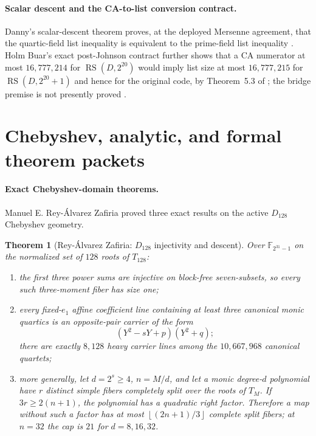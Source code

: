 \documentclass[11pt,a4paper]{amsart}
\numberwithin{equation}{section}
\newtheorem{theorem}{Theorem}[section]
\theoremstyle{remark}
\DeclareMathOperator{\RS}{RS}
\newcommand{\floor}[1]{\left\lfloor#1\right\rfloor}
\begin{document}
\paragraph{Scalar descent and the CA-to-list conversion contract.}
Danny's scalar-descent theorem proves, at the deployed Mersenne agreement, that the quartic-field list inequality is equivalent to the prime-field list inequality \cite{DannyM31Descent26}.  Holm Buar's exact post-Johnson contract further shows that a CA numerator at most $16{,}777{,}214$ for $\RS(D,2^{20})$ would imply list size at most $16{,}777{,}215$ for $\RS(D,2^{20}+1)$ and hence for the original code, by Theorem~5.3 of \cite{ABF26}; the bridge premise is not presently proved \cite{BuarM31PostJohnson26}.

\section{Chebyshev, analytic, and formal theorem packets}
\label{sec:other-experimental}

\paragraph{Exact Chebyshev-domain theorems.}
Manuel E. Rey-\'Alvarez Zafiria proved three exact results on the active $D_{128}$ Chebyshev geometry.

\begin{theorem}[Rey-\'Alvarez Zafiria: $D_{128}$ injectivity and descent]\label{thm:d128-package}
Over $\mathbb F_{2^{31}-1}$ on the normalized set of $128$ roots of $T_{128}$:
\begin{enumerate}[label=\textup{(\roman*)},leftmargin=*]
\item the first three power sums are injective on block-free seven-subsets, so every such three-moment fiber has size one;
\item every fixed-$e_1$ affine coefficient line containing at least three canonical monic quartics is an opposite-pair carrier of the form
\[
 (Y^2-sY+p)(Y^2+q);
\]
there are exactly $8{,}128$ heavy carrier lines among the $10{,}667{,}968$ canonical quartets;
\item more generally, let $d=2^s\ge4$, $n=M/d$, and let a monic degree-$d$ polynomial have $r$ distinct simple fibers completely split over the roots of $T_M$.  If $3r\ge2(n+1)$, the polynomial has a quadratic right factor.  Therefore a map without such a factor has at most $\floor{(2n+1)/3}$ complete split fibers; at $n=32$ the cap is $21$ for $d=8,16,32$.
\end{enumerate}
\end{theorem}
\end{document}
